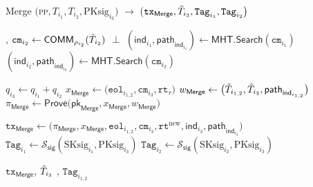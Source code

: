 \begin{algorithm}
	\caption{\textsf{Merge} $\big($\textsc{pp}$, T_{i_{1}}, T_{i_{2}},  \text{PKsig}_{i_3} \big)$ $\rightarrow$ \big($\texttt{tx}_{\textsf{Merge}}, \Tilde{T}_{i_3}, \texttt{Tag}_{i_{1}}, \texttt{Tag}_{i_{2}} \big)$}\label{alg:merge}
	\begin{algorithmic}[1]
		, {$\texttt{cm}_{i_2} \gets \mathsf{COMM}_{\rho_{i_2}}(\Tilde{T}_{i_2}) $}
		 {}
		\State \Return $\perp$
		\EndIf
		\State $(\mathsf{ind}_{i_1}, \mathsf{path}_{\mathsf{ind}_{i_1}}) \gets \mathsf{MHT}.\mathsf{Search}(\texttt{cm}_{i_1})$
		\State $(\mathsf{ind}_{i_2}, \mathsf{path}_{\mathsf{ind}_{i_2}}) \gets \mathsf{MHT}.\mathsf{Search}(\texttt{cm}_{i_2})$
		
		\State $q_{i_3} \gets q_{i_1} +  q_{i_2}$
		\State $x_\textsf{Merge} \gets \big(\texttt{eol}_{i_{1,2}}, \texttt{cm}_{i_3}, \texttt{rt}_\tau \big)$
		\State $w_\textsf{Merge} \gets \big( \Tilde{T}_{i_{1,2}}, \Tilde{T}_{i_3}, \mathsf{path}_{\mathsf{ind}_{i_{1,2}}}\big)$
		\State $\pi_{\textsf{Merge}} \gets \textsf{Prove}\big(\mathsf{pk}_{\textsf{Merge}}, x_{\textsf{Merge}}, w_{\textsf{Merge}}\big)$
		
		\State$\texttt{tx}_{\textsf{Merge}} \gets \big(\pi_{\textsf{Merge}}, x_{\textsf{Merge}}, \texttt{eol}_{i_{1,2}}, \texttt{cm}_{i_3}, \texttt{rt}^{\text{new}}, \mathsf{ind}_{i_3}, \mathsf{path}_{\mathsf{ind}_{i_3}} \big)$
		\State $\texttt{Tag}_{i_1} \leftarrow \mathcal{S}_\mathsf{sig}(\text{SKsig}_{i_1}, \text{PKsig}_{i_3})$
		\State $\texttt{Tag}_{i_2} \leftarrow \mathcal{S}_\mathsf{sig}(\text{SKsig}_{i_2}, \text{PKsig}_{i_3})$
		
		\State \Return $\texttt{tx}_{\textsf{Merge}}$, $\Tilde{T}_{i_3}$ , $\texttt{Tag}_{i_{1,2}}$
	\end{algorithmic}
\end{algorithm}

